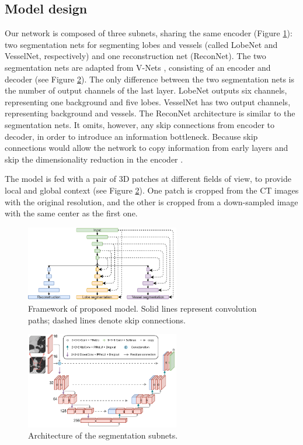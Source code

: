 \subsection{Model design}
Our network is composed of three subnets, sharing the same encoder (Figure \ref{fig:chap2_structure}): two segmentation nets for segmenting lobes and vessels (called LobeNet and VesselNet, respectively) and one reconstruction net (ReconNet). The two segmentation nets are adapted from V-Nets \cite{milletari2016v}, consisting of an encoder and decoder (see Figure \ref{fig:chap2_unet}). The only difference between the two segmentation nets is the number of output channels of the last layer. LobeNet outputs six channels, representing one background and five lobes. VesselNet has two output channels, representing background and vessels. The ReconNet architecture is similar to the segmentation nets. It omits, however, any skip connections from encoder to decoder, in order to introduce an information bottleneck. Because skip connections would allow the network to copy information from early layers and skip the dimensionality reduction in the encoder \cite{chen2019multi}.

The model is fed with a pair of 3D patches at different fields of view, to provide local and global context (see Figure \ref{fig:chap2_unet}). One patch is cropped from the CT images with the original resolution, and the other is cropped from a down-sampled image with the same center as the first one.

\begin{figure}[tb]
    \centering
    \includegraphics[width=0.6\textwidth]{structure.png}
    \caption{Framework of proposed model. Solid lines represent convolution paths; dashed lines denote skip connections.}
    \label{fig:chap2_structure}
\end{figure}

\begin{figure}[tb]
    \centering
    \includegraphics[width=0.6\textwidth]{unet.png}
    \caption{Architecture of the segmentation subnets.}
    \label{fig:chap2_unet}
\end{figure}


